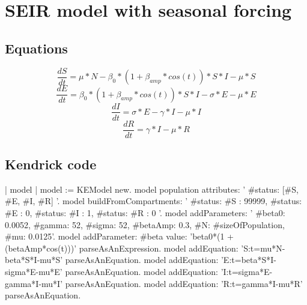 \documentclass[a4paper,10pt,twoside]{book}
\begin{document}
\section{ SEIR model with seasonal forcing}\subsection{ Equations}

  \begin{equation}
    \frac{dS}{dt} = \mu*N - \beta_0*(1+\beta_{amp}*cos(t))*S*I - \mu*S
  \end{equation}
  \begin{equation}
    \frac{dE}{dt} = \beta_0*(1+\beta_{amp}*cos(t))*S*I - \sigma*E - \mu*E
  \end{equation}
  \begin{equation}
    \frac{dI}{dt} = \sigma*E - \gamma*I - \mu*I
  \end{equation}
  \begin{equation}
    \frac{dR}{dt} = \gamma*I - \mu*R
  \end{equation}
  
\subsection{ Kendrick code}

\begin{code}{}
	| model |
	model := KEModel new.
	model population attributes: '{ #status: [#S, #E, #I, #R] }'.
	model
		buildFromCompartments:
			'{
		{ #status: #S }: 99999,
		{ #status: #E }: 0,
		{ #status: #I }: 1,
		{ #status: #R }: 0
	}'.
	model addParameters: '{
		#beta0: 0.0052,
		#gamma: 52,
		#sigma: 52,
		#betaAmp: 0.3,
		#N: #sizeOfPopulation,
		#mu: 0.0125}'.
	model
		addParameter: #beta
		value: 'beta0*(1 + (betaAmp*cos(t)))' parseAsAnExpression.
	model
		addEquation: 'S:t=mu*N-beta*S*I-mu*S' parseAsAnEquation.
	model
		addEquation: 'E:t=beta*S*I-sigma*E-mu*E' parseAsAnEquation.
	model
		addEquation: 'I:t=sigma*E-gamma*I-mu*I' parseAsAnEquation.
	model
		addEquation: 'R:t=gamma*I-mu*R' parseAsAnEquation.
\end{code}
\end{document}
